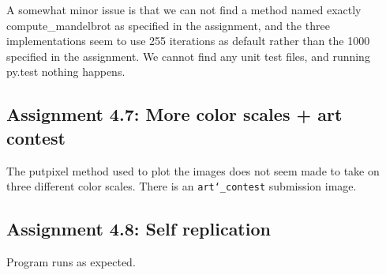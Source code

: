 \documentclass[a4paper]{article}
\begin{document}
A somewhat minor issue is that we can not find a method named exactly compute\_mandelbrot as specified in the assignment, and the three implementations seem to use 255 iterations as default rather than the 1000 specified in the assignment.
\newline
We cannot find any unit test files, and running py.test nothing happens.

\subsection*{Assignment 4.7: More color scales + art contest}

The putpixel method used to plot the images does not seem made to take on three different color scales.\newline
There is an \texttt{art\char`_contest} submission image. 

\subsection*{Assignment 4.8: Self replication}

Program runs as expected.



\end{document}
